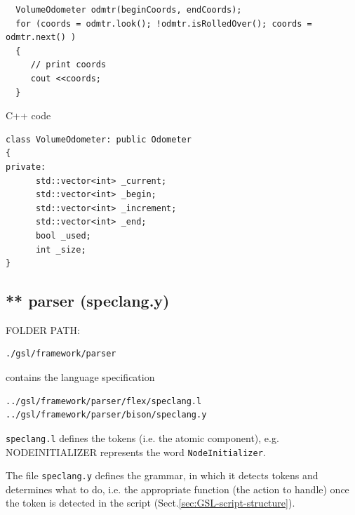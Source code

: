 \begin{verbatim}
  VolumeOdometer odmtr(beginCoords, endCoords);
  for (coords = odmtr.look(); !odmtr.isRolledOver(); coords = odmtr.next() )
  {
     // print coords
     cout <<coords;
  }
\end{verbatim}

C++ code
\begin{verbatim}
class VolumeOdometer: public Odometer
{
private:
      std::vector<int> _current;
      std::vector<int> _begin;
      std::vector<int> _increment;
      std::vector<int> _end;
      bool _used;
      int _size;
}
\end{verbatim}

\subsection{ ** parser (speclang.y)}
\label{sec:MGS-framework-parser}
\label{sec:C_production}
\label{sec:speclang.l}
\label{sec:speclang.y}

FOLDER PATH:
\begin{verbatim}
./gsl/framework/parser
\end{verbatim}
contains the language specification
\begin{verbatim}
../gsl/framework/parser/flex/speclang.l 
../gsl/framework/parser/bison/speclang.y 
\end{verbatim}

\verb!speclang.l! defines the tokens (i.e. the atomic component), e.g.
NODEINITIALIZER represents the word \verb!NodeInitializer!.

The file \verb!speclang.y! defines the grammar, in which it detects tokens and
determines what to do, i.e. the appropriate function (the action to
handle) once the token is detected in the script (Sect.\ref{sec:GSL-script-structure}).


